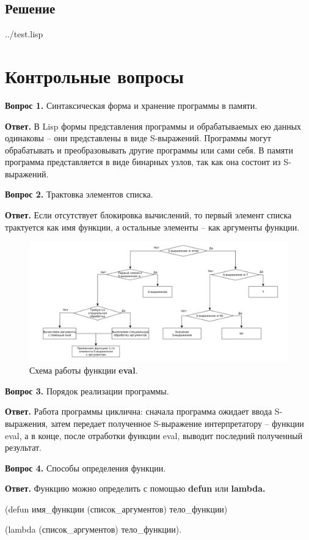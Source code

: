 \subsection*{Решение}
\begin{lstinputlisting}[label=third,caption=Решение задания №3, language=lisp, firstline=31, lastline=57]{../test.lisp}
	
\end{lstinputlisting}


\section*{Контрольные вопросы}
\textbf{Вопрос 1.} Синтаксическая форма и хранение программы в памяти.

\textbf{Ответ.}
В Lisp формы представления программы и обрабатываемых ею данных одинаковы – они представлены в виде S-выражений. Программы могут обрабатывать и преобразовывать другие программы или сами себя. В памяти программа представляется в виде бинарных узлов, так как она состоит из S-выражений.\newline

\textbf{Вопрос 2.} Трактовка элементов списка. 

\textbf{Ответ.}
Если отсутствует блокировка вычислений, то первый элемент списка трактуется как имя функции, а остальные элементы – как аргументы функции.\newline

\begin{figure}[H]
	\begin{center}
		\includegraphics[scale=0.4]{img/eval.png}
	\end{center}
	\caption{Схема работы функции \textbf{eval}.}
	\label{img:eval}
\end{figure}

\textbf{Вопрос 3.} Порядок реализации программы.

\textbf{Ответ.}
Работа программы циклична: сначала программа ожидает ввода S-выражения, затем передает полученное S-выражение интерпретатору – функции eval, а в конце, после отработки функции eval, выводит последний полученный результат.\newline


\textbf{Вопрос 4.} Способы определения функции.

\textbf{Ответ.}
Функцию можно определить с помощью \textbf{defun} или \textbf{lambda.} 

(defun имя\_функции (список\_аргументов) тело\_функции)

(lambda (список\_аргументов) тело\_функции).

